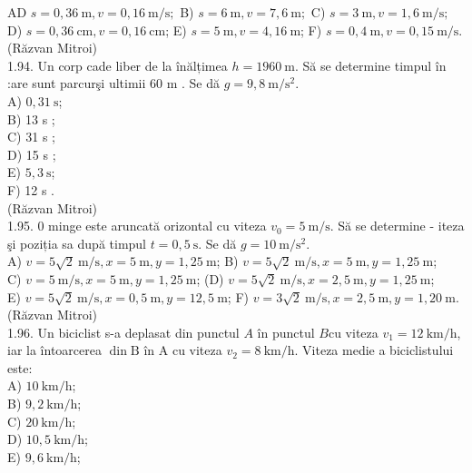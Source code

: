 \documentclass[10pt]{article}
\begin{document}
AD $s=0,36 \mathrm{~m}, v=0,16 \mathrm{~m} / \mathrm{s} ;$ B) $s=6 \mathrm{~m}, v=7,6 \mathrm{~m} ;$ C) $s=3 \mathrm{~m}, v=1,6 \mathrm{~m} / \mathrm{s} ;$\\
D) $s=0,36 \mathrm{~cm}, v=0,16 \mathrm{~cm}$; E) $s=5 \mathrm{~m}, v=4,16 \mathrm{~m}$; F) $s=0,4 \mathrm{~m}, v=0,15 \mathrm{~m} / \mathrm{s}$.\\
(Răzvan Mitroi)\\
1.94. Un corp cade liber de la înălțimea $h=1960 \mathrm{~m}$. Să se determine timpul în :are sunt parcurşi ultimii 60 m . Se dă $g=9,8 \mathrm{~m} / \mathrm{s}^{2}$.\\
A) $0,31 \mathrm{~s}$;\\
B) 13 s ;\\
C) 31 s ;\\
D) 15 s ;\\
E) $5,3 \mathrm{~s}$;\\
F) 12 s .\\
(Răzvan Mitroi)\\
1.95. 0 minge este aruncată orizontal cu viteza $v_{0}=5 \mathrm{~m} / \mathrm{s}$. Să se determine - iteza şi poziția sa după timpul $t=0,5 \mathrm{~s}$. Se dă $g=10 \mathrm{~m} / \mathrm{s}^{2}$.\\
A) $v=5 \sqrt{2} \mathrm{~m} / \mathrm{s}, x=5 \mathrm{~m}, y=1,25 \mathrm{~m}$; B) $v=5 \sqrt{2} \mathrm{~m} / \mathrm{s}, x=5 \mathrm{~m}, y=1,25 \mathrm{~m}$;\\
C) $v=5 \mathrm{~m} / \mathrm{s}, x=5 \mathrm{~m}, y=1,25 \mathrm{~m}$; (D) $v=5 \sqrt{2} \mathrm{~m} / \mathrm{s}, x=2,5 \mathrm{~m}, y=1,25 \mathrm{~m}$;\\
E) $v=5 \sqrt{2} \mathrm{~m} / \mathrm{s}, x=0,5 \mathrm{~m}, y=12,5 \mathrm{~m}$; F) $v=3 \sqrt{2} \mathrm{~m} / \mathrm{s}, x=2,5 \mathrm{~m}, y=1,20 \mathrm{~m}$.\\
(Răzvan Mitroi)\\
1.96. Un biciclist s-a deplasat din punctul $A$ în punctul $B \mathrm{cu}$ viteza $v_{1}=12 \mathrm{~km} / \mathrm{h}$, iar la întoarcerea $\operatorname{din} \mathrm{B}$ în A cu viteza $v_{2}=8 \mathrm{~km} / \mathrm{h}$. Viteza medie a biciclistului este:\\
A) $10 \mathrm{~km} / \mathrm{h}$;\\
B) $9,2 \mathrm{~km} / \mathrm{h}$;\\
C) $20 \mathrm{~km} / \mathrm{h}$;\\
D) $10,5 \mathrm{~km} / \mathrm{h}$;\\
E) $9,6 \mathrm{~km} / \mathrm{h}$;\\
\end{document}
